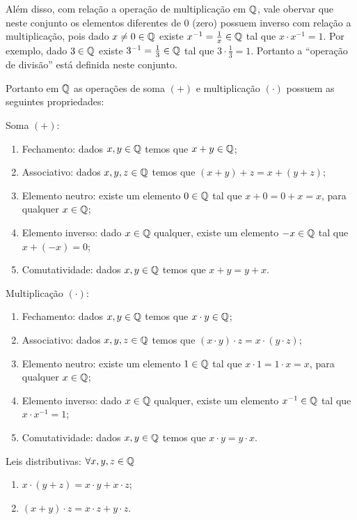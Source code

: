  Além disso, com relação a operação de multiplicação em $\mathbb{Q}$, vale obervar que neste conjunto os elementos diferentes de $0$ (zero) possuem inverso com relação a multiplicação, pois dado $x \neq 0 \in \mathbb{Q}$ existe $x^{-1}= \frac{1}{x} \in \mathbb{Q}$ tal que $x \cdot x^{-1}= 1$. Por exemplo, dado $3 \in \mathbb{Q}$ existe $3^{-1}= \frac{1}{3} \in \mathbb{Q}$ tal que $3 \cdot \frac{1}{3}= 1$. Portanto a ``operação de divisão'' está definida neste conjunto.

   \vskip0.3cm

 Portanto em $\mathbb{Q}$ as operações de soma $(+)$ e multiplicação $(\cdot)$ possuem as seguintes propriedades:

 Soma $(+)$:
 \begin{enumerate}[1)]
 \item Fechamento: dados $x, y \in \mathbb{Q}$ temos que $x+y \in \mathbb{Q}$;
 \item Associativo: dados $x, y, z \in \mathbb{Q}$ temos que $(x+y)+z= x+(y+z)$;
 \item Elemento neutro: existe um elemento $0 \in \mathbb{Q}$ tal que $x+0=0+x=x$, para qualquer $x \in \mathbb{Q}$;
 \item Elemento inverso: dado $x \in \mathbb{Q}$ qualquer, existe um elemento $-x \in \mathbb{Q}$ tal que $x+(-x)=0$;
 \item Comutatividade: dados $x, y \in \mathbb{Q}$ temos que $x+y= y+x$.
 \end{enumerate}

  Multiplicação $(\cdot)$:
 \begin{enumerate}[1)]
 \item Fechamento: dados $x, y \in \mathbb{Q}$ temos que $x \cdot y \in \mathbb{Q}$;
 \item Associativo: dados $x, y, z \in \mathbb{Q}$ temos que $(x \cdot y) \cdot z= x \cdot (y \cdot z)$;
 \item Elemento neutro: existe um elemento $1 \in \mathbb{Q}$ tal que $x \cdot 1= 1 \cdot x= x$, para qualquer $x \in \mathbb{Q}$;
 \item Elemento inverso: dado $x \in \mathbb{Q}$ qualquer, existe um elemento $x^{-1} \in \mathbb{Q}$ tal que $x \cdot x^{-1}= 1$;
 \item Comutatividade: dados $x, y \in \mathbb{Q}$ temos que $x \cdot y= y \cdot x$.
 \end{enumerate}

  Leis distributivas: $\forall x, y, z \in \mathbb{Q}$
 \begin{enumerate}[1)]
 \item $x \cdot (y + z)= x \cdot y + x \cdot z$;
 \item $(x + y) \cdot z= x \cdot z + y \cdot z$.
 \end{enumerate}

